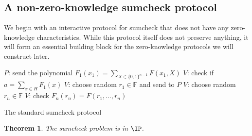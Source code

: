 \documentclass[english,12pt]{reedthesis}
\theoremstyle{plain}
\newtheorem{thm}{Theorem}[section]
\theoremstyle{definition}
\theoremstyle{remark}
\begin{document}
\subsection{A non-zero-knowledge sumcheck protocol}

We begin with an interactive protocol for sumcheck that does not have any
zero-knowledge characteristics. While this protocol itself does not preserve
anything, it will form an essential building block for the zero-knowledge
protocols we will construct later.

\begin{algorithm}[htbp]
  $P$: send the polynomial $F_{1}(x_{1}) = \sum_{X \in \{0, 1\}^{n-1}}F(x_{1}, X)$\;
  $V$: check if $a = \sum_{x \in H}F_{1}(x)$\;
  $V$: choose random $r_{1} \in \mathbb{F}$ and send to $P$\;
  $V$: choose random $r_{n} \in \mathbb{F}$\;
  $V$: check $F_{n}(r_{n}) = F(r_{1}, \ldots, r_{n})$\;
  \caption{The standard sumcheck protocol~\cite[Thm.\ 1]{LFKN92}}\label{alg:sumcheck-std}
\end{algorithm}

\begin{thm}\label{thm:sumcheck-ip}
  The sumcheck problem is in $\IP$.
\end{thm}
\end{document}
